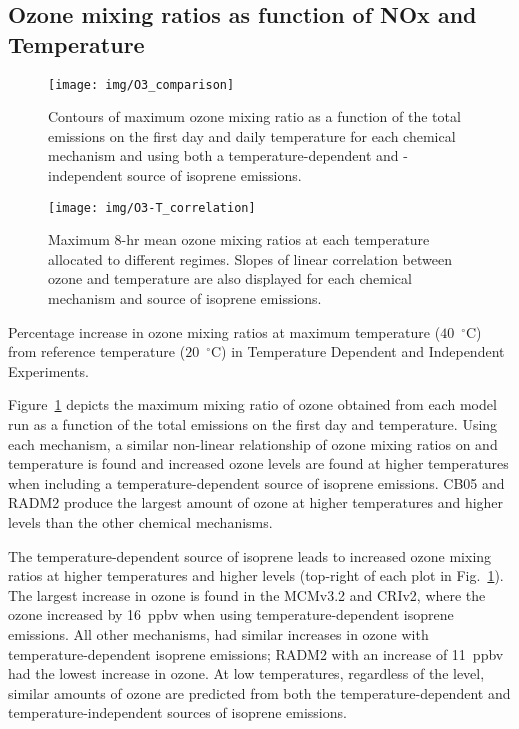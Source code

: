 \subsection{Ozone mixing ratios as function of NOx and Temperature} \label{ss:r_contours}

\begin{figure}%
    \centering%
    \caption{Contours of maximum ozone mixing ratio as a function of the total  emissions on the first day and daily temperature for each chemical mechanism and using both a temperature-dependent and -independent source of isoprene emissions.}
    \label{f:ozone_contours}%
    \texttt{[image: img/O3\_comparison]}
\end{figure}

\begin{figure}%
    \centering%
    \caption{Maximum 8-hr mean ozone mixing ratios at each temperature allocated to different  regimes. Slopes of linear correlation between ozone and temperature are also displayed for each chemical mechanism and source of isoprene emissions.}%
    \label{f:O3-T}%
    \texttt{[image: img/O3-T\_correlation]}%
\end{figure}

\begin{table}%
    \centering%
    \caption{Percentage increase in ozone mixing ratios at maximum temperature ($40$~$^{\circ}$C) from reference temperature ($20$~$^{\circ}$C) in Temperature Dependent and Independent Experiments.}%
    \label{t:difference_td_ti}%
    
\end{table}

Figure~\ref{f:ozone_contours} depicts the maximum mixing ratio of ozone obtained from each model run as a function of the total  emissions on the first day and temperature.
Using each mechanism, a similar non-linear relationship of ozone mixing ratios on  and temperature is found and increased ozone levels are found at higher temperatures when including a temperature-dependent source of isoprene emissions.
CB05 and RADM2 produce the largest amount of ozone at higher temperatures and higher  levels than the other chemical mechanisms.

The temperature-dependent source of isoprene leads to increased ozone mixing ratios at higher temperatures and higher  levels (top-right of each plot in Fig.~\ref{f:ozone_contours}).
The largest increase in ozone is found in the MCMv3.2 and CRIv2, where the ozone increased by 16~ppbv when using temperature-dependent isoprene emissions.
All other mechanisms, had similar increases in ozone with temperature-dependent isoprene emissions; RADM2 with an increase of 11~ppbv had the lowest increase in ozone.
At low temperatures, regardless of the  level, similar amounts of ozone are predicted from both the temperature-dependent and temperature-independent sources of isoprene emissions.

